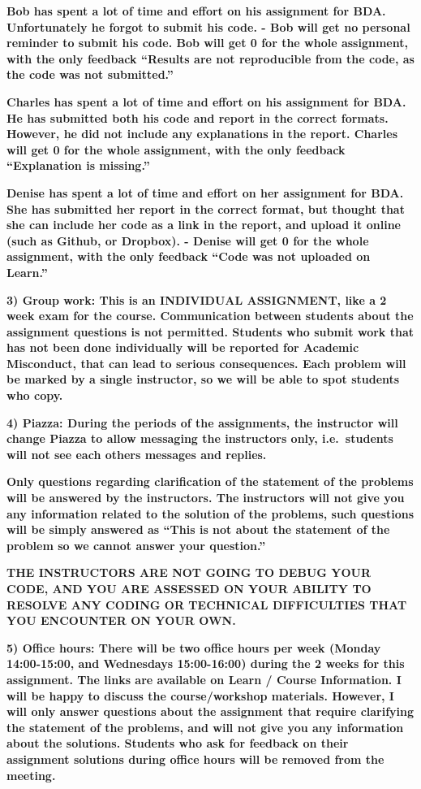 \documentclass[
]{article}
\begin{document}
\textbf{Bob has spent a lot of time and effort on his assignment for
BDA. Unfortunately he forgot to submit his code. - Bob will get no
personal reminder to submit his code. Bob will get 0 for the whole
assignment, with the only feedback ``Results are not reproducible from
the code, as the code was not submitted.''}

\textbf{Charles has spent a lot of time and effort on his assignment for
BDA. He has submitted both his code and report in the correct formats.
However, he did not include any explanations in the report. Charles will
get 0 for the whole assignment, with the only feedback ``Explanation is
missing.''}

\textbf{Denise has spent a lot of time and effort on her assignment for
BDA. She has submitted her report in the correct format, but thought
that she can include her code as a link in the report, and upload it
online (such as Github, or Dropbox). - Denise will get 0 for the whole
assignment, with the only feedback ``Code was not uploaded on Learn.''}

\textbf{3) Group work: This is an INDIVIDUAL ASSIGNMENT, like a 2 week
exam for the course. Communication between students about the assignment
questions is not permitted. Students who submit work that has not been
done individually will be reported for Academic Misconduct, that can
lead to serious consequences. Each problem will be marked by a single
instructor, so we will be able to spot students who copy.}

\textbf{4) Piazza: During the periods of the assignments, the instructor
will change Piazza to allow messaging the instructors only,
i.e.~students will not see each others messages and replies.}

\textbf{Only questions regarding clarification of the statement of the
problems will be answered by the instructors. The instructors will not
give you any information related to the solution of the problems, such
questions will be simply answered as ``This is not about the statement
of the problem so we cannot answer your question.''}

\textbf{THE INSTRUCTORS ARE NOT GOING TO DEBUG YOUR CODE, AND YOU ARE
ASSESSED ON YOUR ABILITY TO RESOLVE ANY CODING OR TECHNICAL DIFFICULTIES
THAT YOU ENCOUNTER ON YOUR OWN.}

\textbf{5) Office hours: There will be two office hours per week (Monday
14:00-15:00, and Wednesdays 15:00-16:00) during the 2 weeks for this
assignment. The links are available on Learn / Course Information. I
will be happy to discuss the course/workshop materials. However, I will
only answer questions about the assignment that require clarifying the
statement of the problems, and will not give you any information about
the solutions. Students who ask for feedback on their assignment
solutions during office hours will be removed from the meeting.}
\end{document}
